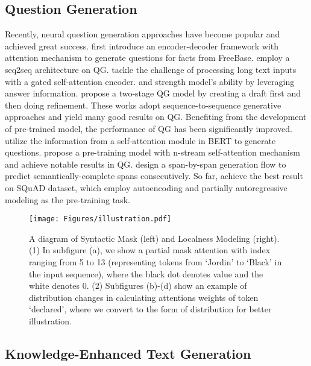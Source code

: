 \documentclass[11pt]{article}
\begin{document}
\subsection{Question Generation}


Recently, neural question generation approaches have become popular and achieved great success.  \citet{serban-etal-2016-generating} first introduce an encoder-decoder framework with attention mechanism to generate questions for facts from FreeBase.  \citet{du-etal-2017-learning} employ a seq2seq architecture on QG. \citet{zhao-etal-2018-paragraph} tackle the challenge of processing long text inputs with a gated self-attention encoder. \citet{song-etal-2018-leveraging} and \citet{Kim_Lee_Shin_Jung_2019} strength model's ability by leveraging answer information. \citet{Meng_Ren_Chen_Monz_Ma_de_Rijke_2020} propose a two-stage QG model by creating a draft first and then doing refinement. These works adopt sequence-to-sequence generative approaches and yield many good results on QG. Benefiting from the development of pre-trained model, the performance of QG has been significantly improved. \citet{varanasi-etal-2020-copybert} utilize the information from a self-attention module in BERT \citep{devlin-etal-2019-bert} to generate questions. \citet{qi-etal-2020-prophetnet} propose a pre-training model with n-stream self-attention mechanism and achieve notable results in QG. \citet{ijcai2020-553} design a span-by-span generation flow to predict semantically-complete spans consecutively. So far, \citet{bao2020unilmv2} achieve the best result on SQuAD dataset, which employ autoencoding and partially autoregressive modeling as the pre-training task. 

\begin{figure*}[!ht]
    \centering
    \texttt{[image: Figures/illustration.pdf]}
    \caption{A diagram of Syntactic Mask (left) and Localness Modeling (right). (1) In subfigure (a), we show a partial mask attention with index ranging from 5 to 13 (representing tokens from `Jordin' to `Black' in the input sequence), where the black dot denotes value  and the white denotes 0. (2) Subfigures (b)-(d) show an example of distribution changes in calculating attentions weights of token `declared', where we convert  to the form of distribution for better illustration.}
    \label{localness-fig}
\end{figure*}


\subsection{Knowledge-Enhanced Text Generation}
\end{document}
